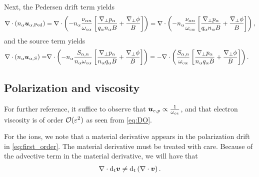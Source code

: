 Next, the Pedersen drift term yields
%
\begin{align*}
    \nabla\cdot\left(n_\alpha \boldsymbol{u}_{\alpha,\text{Ped}}\right)
    =
    \nabla\cdot\left(
    - n_\alpha \frac{\nu_{\alpha n} }{\omega_{c\alpha}}
    \left[\frac{\nabla_\perp p_\alpha}{q_\alpha n_\alpha B}
    + \frac{\nabla_\perp \phi}{B} \right]
    \right)
    =
    \nabla\cdot\left(
    - n_\alpha \frac{\nu_{\alpha n} }{\omega_{c\alpha}}
    \left[\frac{\nabla_\perp p_\alpha}{q_\alpha n_\alpha B}
    + \frac{\nabla_\perp \phi}{B} \right]
    \right)
    ,
\end{align*}
%
and the source term yields
%
\begin{align*}
    \nabla\cdot\left(n_\alpha \boldsymbol{u}_{\alpha,S}\right)
    =&
    \nabla\cdot\left(
    - n_\alpha
  \frac{ S_{\alpha,n}}{n_\alpha \omega_{c\alpha}}
  \left[
  \frac{\nabla_\perp p_\alpha}{n_\alpha  q_\alpha B}
  + \frac{\nabla_\perp \phi}{B}
  \right]    \right)
  =
  -
  \nabla\cdot\left(
  \frac{ S_{\alpha,n}}{\omega_{c\alpha}}
  \left[
  \frac{\nabla_\perp p_\alpha}{n_\alpha  q_\alpha B}
  + \frac{\nabla_\perp \phi}{B}
  \right]    \right).
\end{align*}
%

\subsection{Polarization and viscosity}
\label{sec:gyrovisc}
%
For further reference, it suffice to observe that $\boldsymbol{u}_{e,p}\propto\frac{1}{\omega_{ce}}$, and that electron viscosity is of order $\mathcal{O}(\varepsilon^2)$ as seen from \cref{eq:DO}.

For the ions, we note that a material derivative appears in the polarization drift in \cref{eq:first_order}.
The material derivative must be treated with care.
Because of the advective term in the material derivative, we will have that
%
\begin{align*}
    \nabla\cdot \text{d}_t \boldsymbol{v} \neq  \text{d}_t \left(\nabla\cdot \boldsymbol{v}\right).
\end{align*}
%

